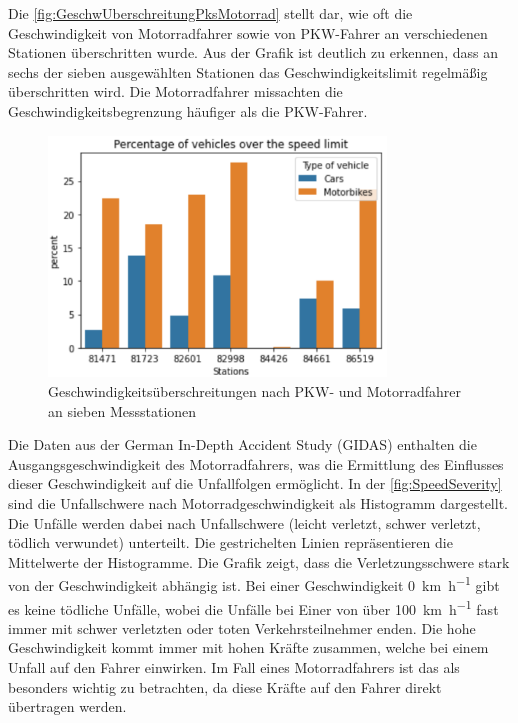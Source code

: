 Die \autoref{fig:GeschwUberschreitungPksMotorrad} stellt dar, wie oft die Geschwindigkeit von Motorradfahrer sowie von PKW-Fahrer an verschiedenen Stationen überschritten wurde. Aus der Grafik ist deutlich zu erkennen, dass an sechs der sieben ausgewählten Stationen das Geschwindigkeitslimit regelmäßig überschritten wird.
Die Motorradfahrer missachten die Geschwindigkeitsbegrenzung häufiger als die PKW-Fahrer. \citep{Maire2020}


\begin{figure}
	\centering
	\includegraphics[width=0.8\textwidth]{Bilder/GeschwUberschreitungPksMotorrad.png}
	\caption{Geschwindigkeitsüberschreitungen nach PKW- und Motorradfahrer an sieben Messstationen\citep{Maire2020}}
	\label{fig:GeschwUberschreitungPksMotorrad}
\end{figure}
Die Daten aus der German In-Depth Accident Study (GIDAS) enthalten die Ausgangsgeschwindigkeit des Motorradfahrers, was die Ermittlung des Einflusses dieser Geschwindigkeit auf die Unfallfolgen ermöglicht. In der \autoref{fig:SpeedSeverity} sind die Unfallschwere nach Motorradgeschwindigkeit als Histogramm dargestellt. Die Unfälle werden dabei nach Unfallschwere (leicht verletzt, schwer verletzt, tödlich verwundet) unterteilt. Die gestrichelten Linien repräsentieren die Mittelwerte der Histogramme.
Die Grafik zeigt, dass die Verletzungsschwere stark von der Geschwindigkeit abhängig ist. Bei einer Geschwindigkeit \SI[per-mode = symbol]{0}{\kilo\meter\per\hour} gibt es keine tödliche Unfälle, wobei die Unfälle bei Einer von über \SI[per-mode = symbol]{100}{\kilo\meter\per\hour} fast immer mit schwer verletzten oder toten Verkehrsteilnehmer enden. Die hohe Geschwindigkeit kommt immer mit hohen Kräfte zusammen, welche bei einem Unfall auf den Fahrer einwirken. Im Fall eines Motorradfahrers ist das als besonders wichtig zu betrachten, da diese Kräfte auf den Fahrer direkt übertragen werden. \citep{Maire2020}


